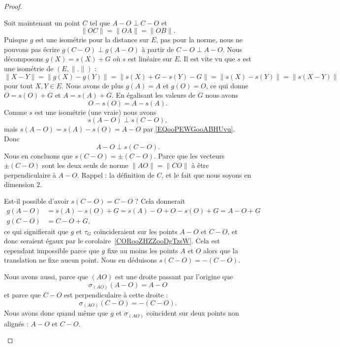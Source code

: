 \begin{proof}
\begin{subproof}
\begin{subproof}
			Soit maintenant un point \( C\) tel que \( A-O\perp C-O\) et
			\begin{equation}
				\| OC \|=\| OA \|=\| OB \|.
			\end{equation}
			Puisque \( g\) est une isométrie pour la distance sur \( E\), pas pour la norme, nous ne pouvons pas écrire \( g(C-O)\perp g(A-O)\) à partir de \( C-O\perp A-O\). Nous décomposons \( g(X)=s(X)+G\) où \( s\) est linéaire sur \( E\). Il est vite vu que \( s\) est une isométrie de \( (E,\| . \|)\) :
			\begin{equation}
				\| X-Y \|=\| g(X)-g(Y) \|=\| s(X)+G-s(Y)-G \|=\| s(X)-s(Y) \|=\| s(X-Y) \|
			\end{equation}
			pour tout \( X,Y\in E\). Nous avons de plus \( g(A)=A\) et \( g(O)=O\), ce qui donne \( O=s(O)+G\) et \( A=s(A)+G\). En égalisant les valeurs de \( G\) nous avons
			\begin{equation}        \label{EQooPEWGooABHUvu}
				O-s(O)=A-s(A).
			\end{equation}
			Comme \( s\) est une isométrie (une vraie) nous avons
			\begin{equation}
				s(A-O)\perp s(C-O),
			\end{equation}
			mais \( s(A-O)=s(A)-s(O)=A-O\) par \eqref{EQooPEWGooABHUvu}. Donc
			\begin{equation}
				A-O\perp s(C-O).
			\end{equation}
			Nous en concluons que \( s(C-O)=\pm (C-O)\). Parce que les vecteurs \( \pm(C-O)\) sont les deux seuls de norme \( \| AO \| =\| CO \|\) à être perpendiculaire à \( A-O\). Rappel : la définition de \( C\), et le fait que nous soyons en dimension \( 2\).

			Est-il possible d'avoir \( s(C-O)=C-O\) ? Cela donnerait
			\begin{subequations}
				\begin{align}
					g(A-O) & =s(A)-s(O)+G=s(A)-O+O-s(O)+G=A-O+G \\
					g(C-O) & =C-O+G,
				\end{align}
			\end{subequations}
			ce qui signifierait que \( g\) et \( \tau_G\) coïncideraient sur les points \( A-O\) et \( C-O\), et donc seraient égaux par le corolaire~\ref{CORooZHZZooDgTzsW}. Cela est cependant impossible parce que \( g\) fixe au moins les points \( A\) et \( O\) alors que la translation ne fixe aucun point. Nous en déduisons \( s(C-O)=-(C-O)\).

			Nous avons aussi, parce que \( (AO)\) est une droite passant par l'origine que
			\begin{equation}
				\sigma_{(AO)}(A-O)=A-O
			\end{equation}
			et parce que \( C-O\) est perpendiculaire à cette droite :
			\begin{equation}
				\sigma_{(AO)}(C-O)=-(C-O).
			\end{equation}
			Nous avons donc quand même que \( g\) et \( \sigma_{(AO)}\) coïncident sur deux points non alignés : \( A-O\) et \( C-O\).
		\end{subproof}


\end{subproof}
\end{proof}
